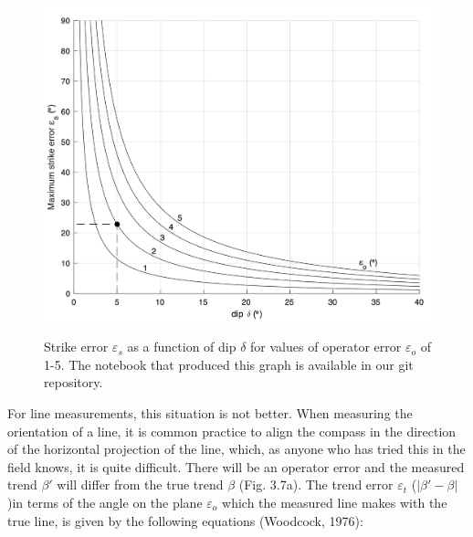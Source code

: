 \documentclass[a4paper , 12pt]{book}
\begin{document}
\begin{figure}[ht]
    \centering
    {\includegraphics[width=13cm]{Figures/ch3f6.png}}
    \caption{Strike error $\varepsilon_s$ as a function of dip $\delta$ for values of operator error $\varepsilon_o$  of 1-5\degree. The notebook that produced this graph is available in our git repository.}
\end{figure}

For line measurements, this situation is not better. When measuring the orientation of a line, it is common practice to align the compass in the direction of the horizontal projection of the line, which, as anyone who has tried this in the field knows, it is quite difficult. There will be an operator error and the measured trend $\beta\text{$'$}$ will differ from the true trend $\beta$ (Fig. 3.7a). The trend error $\varepsilon_t$ ($|\beta\text{$'$}- \beta|$)in terms of the angle on the plane $\varepsilon_o$ which the measured line makes with the true line, is given by the following equations (Woodcock, 1976): 
\end{document}
